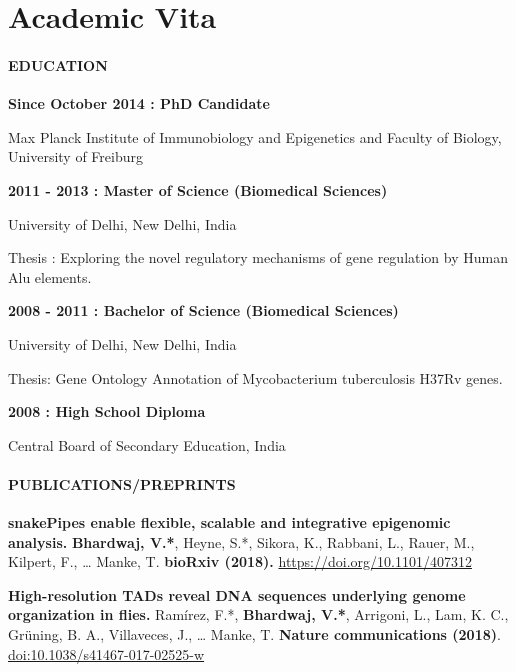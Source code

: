 \documentclass[11pt,twoside]{MPIthesis}
\theoremstyle{definition}
\theoremstyle{definition}
\theoremstyle{definition}
\theoremstyle{remark}
\begin{document}


\chapter{Academic Vita}\label{academic-vita}


\subsubsection{EDUCATION}\label{education}

\textbf{Since October 2014 : PhD Candidate}

Max Planck Institute of Immunobiology and Epigenetics and Faculty of
Biology, University of Freiburg

\textbf{2011 - 2013 : Master of Science (Biomedical Sciences)}

University of Delhi, New Delhi, India

Thesis : Exploring the novel regulatory mechanisms of gene regulation by
Human Alu elements.

\textbf{2008 - 2011 : Bachelor of Science (Biomedical Sciences)}

University of Delhi, New Delhi, India

Thesis: Gene Ontology Annotation of Mycobacterium tuberculosis H37Rv
genes.

\textbf{2008 : High School Diploma}

Central Board of Secondary Education, India

\subsubsection{PUBLICATIONS/PREPRINTS}\label{publicationspreprints}

\textbf{snakePipes enable flexible, scalable and integrative epigenomic
analysis.} \textbf{Bhardwaj, V.*}, Heyne, S.*, Sikora, K., Rabbani, L.,
Rauer, M., Kilpert, F., \ldots{} Manke, T. \textbf{bioRxiv (2018).}
\href{https://doi.org/10.1101/407312}{{https://doi.org/10.1101/407312}}

\textbf{High-resolution TADs reveal DNA sequences underlying genome
organization in flies.} Ramírez, F.*, \textbf{Bhardwaj, V.*}, Arrigoni,
L., Lam, K. C., Grüning, B. A., Villaveces, J., \ldots{} Manke, T.
\textbf{Nature communications (2018)}.
\href{https://www.nature.com/articles/s41467-017-02525-w}{{doi:10.1038/s41467-017-02525-w}}
\end{document}
